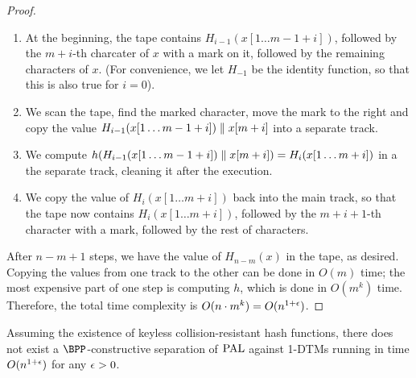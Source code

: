 \begin{proof}
\begin{enumerate}
    \item At the beginning, the tape contains $H_{i-1}(x[1 \ldots m-1+i])$, followed by the $m+i$-th 
    charcater of $x$ with a mark on it, followed by the remaining characters of $x$. (For convenience,
    we let $H_{-1}$ be the identity function, so that this is also true for $i = 0$).
    \item We scan the tape, find the marked character, move the mark to the right and copy the value 
    $H_{i-1}(x[1 \ldots m-1+i]) \parallel x[m+i]$ into a separate track. 
    \item We compute $h(H_{i-1}(x[1 \ldots m-1+i]) \parallel x[m+i]) = H_i(x[1 \ldots m+i])$ in a the separate
    track, cleaning it after the execution.
    \item We copy the value of $H_i(x[1 \ldots m+i])$ back into the main track, so that the tape now contains
    $H_{i}(x[1 \ldots m+i])$, followed by the $m+i+1$-th character with a mark, followed by the rest of characters.
\end{enumerate}

After $n-m+1$ steps, we have the value of $H_{n-m}(x)$ in the tape, as desired. Copying the values from one
track to the other can be done in $O(m)$ time; the most expensive part of one step is computing $h$, which 
is done in $O(m^k)$ time. Therefore, the total time complexity is $O(n \cdot m^k) = O(n^{1+\epsilon})$. 



\end{proof}


\begin{theorem}
    \label{thm:nobppseparation}
    Assuming the existence of keyless collision-resistant hash functions, there does not exist a 
    $\BPP$-constructive separation of $\mathrm{PAL}$ against 1-DTMs running in time $O(n^{1+\epsilon})$ for any $\epsilon > 0$.
\end{theorem}

